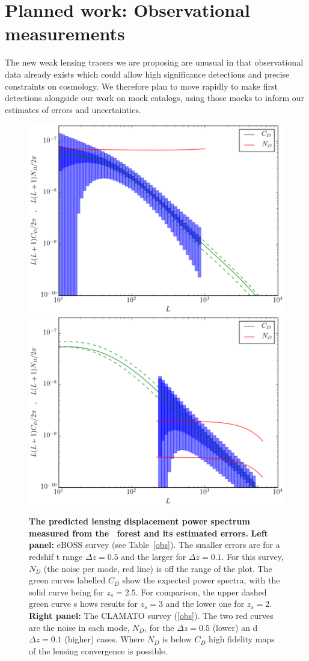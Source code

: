 \section{Planned work: Observational measurements}

The new weak lensing tracers we are proposing are unusual in that
observational data already exists which could allow high
significance detections and precise constraints on cosmology. We
therefore plan to move rapidly  to make first detections alongside
our work on mock catalogs,  using those mocks to
inform our estimates of errors and uncertainties.



\begin{figure}[h]
 \includegraphics[width=0.5\columnwidth]{figs/eBOSS.eps}
 \includegraphics[width=0.5\columnwidth]{figs/CLAMATO.eps}
 \caption{ \footnotesize {\bf The predicted lensing displacement power spectrum  measured
from the \lya\ forest and its 
estimated errors. }
{\bf Left panel:}
eBOSS survey  (see Table~\ref{obs}). The smaller errors are for a redshif
t range $\Delta z =0.5$ and the larger for $\Delta z = 0.1$.  For this survey,  $N_D$ (the noise per 
mode, red line)  is off the range of the plot.  The green curves labelled $C_D$ show the expected power spectra, with the solid curve being for $z_s=2.5$.  For comparison, the upper dashed green curve s
hows results for $z_s=3$ and the lower one for $z_s=2$. {\bf Right panel:}
The CLAMATO survey (\ref{obs}).
The two red curves are the noise in each mode, $N_D$, for the $\Delta z =0.5$ (lower) an
d $\Delta z = 0.1$ (higher) cases.  Where $N_D$ is below $C_D$ high fidelity maps of the lensing convergence is possible.}

 \label{pkpred}
\end{figure}



